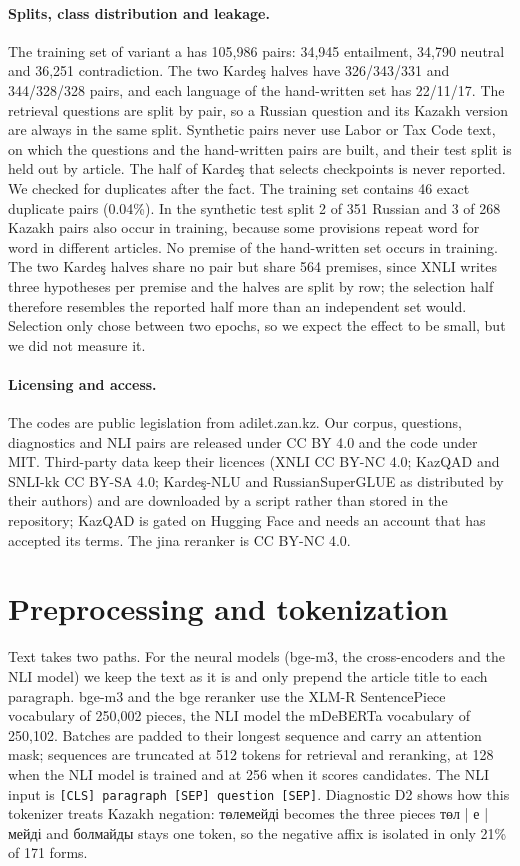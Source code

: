 \documentclass[11pt]{article}
\newcommand{\ru}[1]{#1}
\begin{document}
\paragraph{Splits, class distribution and leakage.} The training set of variant a has 105,986 pairs: 34,945
entailment, 34,790 neutral and 36,251 contradiction. The two Karde\c{s} halves have 326/343/331 and 344/328/328
pairs, and each language of the hand-written set has 22/11/17. The retrieval questions are split by pair, so a
Russian question and its Kazakh version are always in the same split. Synthetic pairs never use Labor or Tax Code
text, on which the questions and the hand-written pairs are built, and their test split is held out by article.
The half of Karde\c{s} that selects checkpoints is never reported. We checked for duplicates after the fact. The
training set contains 46 exact duplicate pairs (0.04\%). In the synthetic test split 2 of 351 Russian and 3 of 268
Kazakh pairs also occur in training, because some provisions repeat word for word in different articles. No
premise of the hand-written set occurs in training. The two Karde\c{s} halves share no pair but share 564
premises, since XNLI writes three hypotheses per premise and the halves are split by row; the selection half
therefore resembles the reported half more than an independent set would. Selection only chose between two
epochs, so we expect the effect to be small, but we did not measure it.

\paragraph{Licensing and access.} The codes are public legislation from adilet.zan.kz. Our corpus, questions,
diagnostics and NLI pairs are released under CC BY 4.0 and the code under MIT. Third-party data keep their
licences (XNLI CC BY-NC 4.0; KazQAD and SNLI-kk CC BY-SA 4.0; Karde\c{s}-NLU and RussianSuperGLUE as distributed by
their authors) and are downloaded by a script rather than stored in the repository; KazQAD is gated on Hugging Face
and needs an account that has accepted its terms. The jina reranker is CC BY-NC 4.0.

\section{Preprocessing and tokenization}

Text takes two paths. For the neural models (bge-m3, the cross-encoders and the NLI model) we keep the text as
it is and only prepend the article title to each paragraph. bge-m3 and the bge reranker use the XLM-R
SentencePiece vocabulary of 250,002 pieces, the NLI model the mDeBERTa vocabulary of 250,102. Batches are padded
to their longest sequence and carry an attention mask; sequences are truncated at 512 tokens for retrieval and
reranking, at 128 when the NLI model is trained and at 256 when it scores candidates. The NLI input is
\texttt{[CLS] paragraph [SEP] question [SEP]}. Diagnostic D2 shows how this tokenizer treats Kazakh negation:
\ru{төлемейді} becomes the three pieces \ru{төл | е | мейді} and \ru{болмайды} stays one token, so the negative affix is
isolated in only 21\% of 171 forms.
\end{document}
